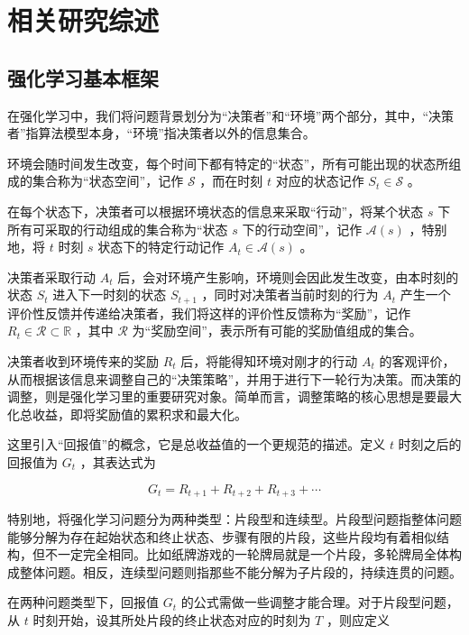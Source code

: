 

\chapter{相关研究综述}
\label{chpt:relatedwork}

\section{强化学习基本框架}

在强化学习中，我们将问题背景划分为“决策者”和“环境”两个部分，其中，“决策者”指算法模型本身，“环境”指决策者以外的信息集合。

环境会随时间发生改变，每个时间下都有特定的“状态”，所有可能出现的状态所组成的集合称为“状态空间”，记作 $\mathcal S$ ，而在时刻 $t$ 对应的状态记作 $S_t\in \mathcal S$ 。

在每个状态下，决策者可以根据环境状态的信息来采取“行动”，将某个状态 $s$ 下所有可采取的行动组成的集合称为“状态 $s$ 下的行动空间”，记作 $\mathcal{A}(s)$ ，特别地，将 $t$ 时刻 $s$ 状态下的特定行动记作 $A_t\in\mathcal{A}(s)$ 。

决策者采取行动 $A_t$ 后，会对环境产生影响，环境则会因此发生改变，由本时刻的状态 $S_t$ 进入下一时刻的状态 $S_{t+1}$ ，同时对决策者当前时刻的行为 $A_t$ 产生一个评价性反馈并传递给决策者，我们将这样的评价性反馈称为“奖励”，记作 $R_{t}\in\mathcal{R}\subset\mathbb{R}$ ，其中 $\mathcal{R}$ 为“奖励空间”，表示所有可能的奖励值组成的集合。

决策者收到环境传来的奖励 $R_{t}$ 后，将能得知环境对刚才的行动 $A_t$ 的客观评价，从而根据该信息来调整自己的“决策策略”，并用于进行下一轮行为决策。而决策的调整，则是强化学习里的重要研究对象。简单而言，调整策略的核心思想是要最大化总收益，即将奖励值的累积求和最大化。

这里引入“回报值”的概念，它是总收益值的一个更规范的描述。定义 $t$ 时刻之后的回报值为 $G_t$ ，其表达式为

\begin{equation}
G_t = R_{t+1}+R_{t+2}+R_{t+3}+\cdots
\end{equation}

特别地，将强化学习问题分为两种类型：片段型和连续型。片段型问题指整体问题能够分解为存在起始状态和终止状态、步骤有限的片段，这些片段均有着相似结构，但不一定完全相同。比如纸牌游戏的一轮牌局就是一个片段，多轮牌局全体构成整体问题。相反，连续型问题则指那些不能分解为子片段的，持续连贯的问题。

在两种问题类型下，回报值 $G_t$ 的公式需做一些调整才能合理。对于片段型问题，从 $t$ 时刻开始，设其所处片段的终止状态对应的时刻为 $T$ ，则应定义

